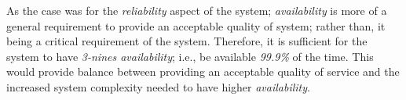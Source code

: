 As the case was for the \emph{reliability} aspect of the system; \emph{availability} is more of a general requirement to provide an acceptable quality of system; rather than, it being a critical requirement of the system. Therefore, it is sufficient for the system to have \emph{3-nines availability}; i.e., be available \emph{99.9\%} of the time. This would provide balance between providing an acceptable quality of service and the increased system complexity needed to have higher \emph{availability}.
